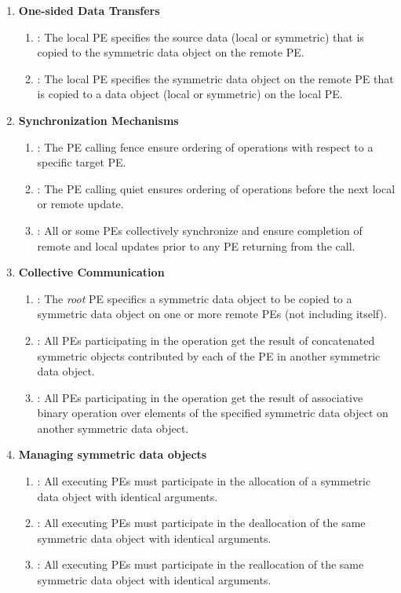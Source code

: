 \begin{enumerate}
\item \textbf{One-sided Data Transfers }

\begin{enumerate}
\item {}: The local \ac{PE} specifies the source
data (local or symmetric) that is copied to the symmetric data object on the remote \ac{PE}. 
\item {}: The local \ac{PE} specifies the symmetric data object on the remote \ac{PE}
that is copied to a data object (local or symmetric) on the local \ac{PE}. 
\end{enumerate}

\item \textbf{Synchronization Mechanisms }
\begin{enumerate}
\item {}: The \ac{PE} calling fence ensure ordering of  operations with respect to a specific target \ac{PE}. 
\item {}: The \ac{PE} calling quiet ensures ordering of  operations before the next local or remote update. 
\item {}: All or some \ac{PE}s collectively synchronize and ensure completion of remote and local updates prior to any \ac{PE} returning from the call.
\end{enumerate}
\item \textbf{Collective Communication}

\begin{enumerate}
\item {}: The \textit{root} \ac{PE} specifics a symmetric data object to be copied to a symmetric data object on one or more remote \ac{PE}s (not including itself). 
\item {}: All \ac{PE}s participating in the operation get the result of concatenated symmetric objects contributed by each of the \ac{PE} in another symmetric data object.
\item {}: All \ac{PE}s participating in the operation get the result of associative binary operation over elements of the specified symmetric data object on another symmetric data object. 
\end{enumerate}

\item \textbf{Managing symmetric data objects}
\begin{enumerate}
\item {}: All executing \ac{PE}s must participate in the allocation of a symmetric data object with identical arguments.
\item  {}: All executing \ac{PE}s must participate in the deallocation of the same symmetric data object with identical arguments.
\item  {}: All executing \ac{PE}s must participate in the reallocation of the same symmetric data object with identical arguments.
\end{enumerate}


\end{enumerate}
